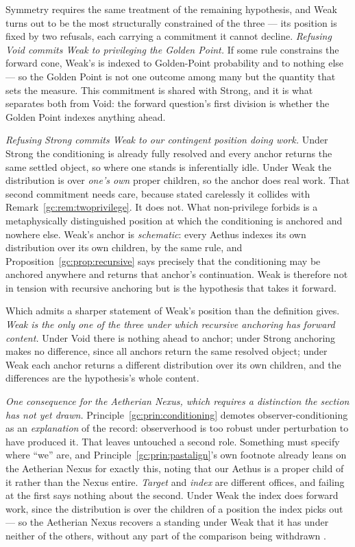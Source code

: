 \begin{remark}\label{gc:rem:weakposition}
Symmetry requires the same treatment of the remaining hypothesis, and
Weak turns out to be the most structurally constrained of the three ---
its position is fixed by two refusals, each carrying a commitment it
cannot decline. \emph{Refusing Void commits Weak to privileging the Golden Point.} If
some rule constrains the forward cone, Weak's is indexed to
Golden-Point probability and to nothing else --- so the Golden Point is
not one outcome among many but the quantity that sets the measure. This
commitment is shared with Strong, and it is what separates both from
Void: the forward question's first division is whether the Golden Point
indexes anything ahead.

\emph{Refusing Strong commits Weak to our contingent position doing
work.} Under Strong the conditioning is already fully resolved and every
anchor returns the same settled object, so where one stands is
inferentially idle. Under Weak the distribution is over \emph{one's own}
proper children, so the anchor does real work. That second commitment needs care, because stated carelessly it collides
with Remark~\ref{gc:rem:twoprivilege}. It does not. What non-privilege
forbids is a metaphysically distinguished position at which the
conditioning is anchored and nowhere else. Weak's anchor is
\emph{schematic}: every Aethus indexes its own distribution over its own
children, by the same rule, and Proposition~\ref{gc:prop:recursive} says
precisely that the conditioning may be anchored anywhere and returns
that anchor's continuation. Weak is therefore not in tension with
recursive anchoring but is the hypothesis that takes it forward.

Which admits a sharper statement of Weak's position than the definition
gives. \emph{Weak is the only one of the three under which recursive
anchoring has forward content.} Under Void there is nothing ahead to
anchor; under Strong anchoring makes no difference, since all anchors
return the same resolved object; under Weak each anchor returns a
different distribution over its own children, and the differences are
the hypothesis's whole content.

\emph{One consequence for the Aetherian Nexus, which requires a
distinction the section has not yet drawn.}
Principle~\ref{gc:prin:conditioning} demotes observer-conditioning as an
\emph{explanation} of the record: observerhood is too robust under
perturbation to have produced it. That leaves untouched a second role.
Something must specify where ``we'' are, and
Principle~\ref{gc:prin:pastalign}'s own footnote already leans on the
Aetherian Nexus for exactly this, noting that our Aethus is a proper
child of it rather than the Nexus entire. \emph{Target} and \emph{index}
are different offices, and failing at the first says nothing about the
second. Under Weak the index does forward work, since the distribution
is over the children of a position the index picks out --- so the
Aetherian Nexus recovers a standing under Weak that it has under neither
of the others, without any part of the comparison being withdrawn
\cite{Nexus}.


\end{remark}
